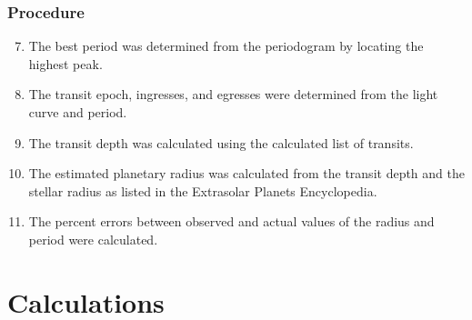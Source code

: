 \begin{frame}
    \frametitle{Procedure}
    \begin{enumerate}
        \setcounter{enumi}{6}
        \item<1-> The best period was determined from the periodogram by locating the highest peak.
        \item<2-> The transit epoch, ingresses, and egresses were determined from the light curve and period.
        \item<3-> The transit depth was calculated using the calculated list of transits.
        \item<4-> The estimated planetary radius was calculated from the transit depth and the stellar radius as listed in the Extrasolar Planets Encyclopedia.
        \item<5-> The percent errors between observed and actual values of the radius and period were calculated.
    \end{enumerate}
\end{frame}

\section{Calculations}

